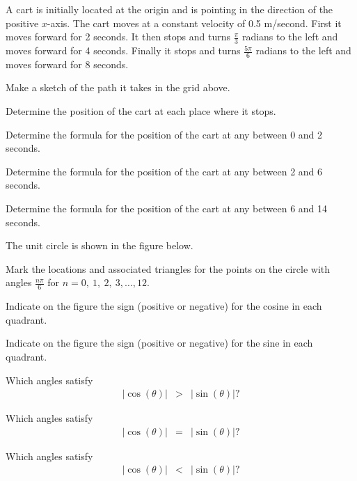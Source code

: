 \begin{problem}
\item A cart is initially located at the origin and is pointing in the
  direction of the positive $x$-axis. The cart moves at a constant
  velocity of 0.5 m/second. First it moves forward for 2 seconds. It
  then stops and turns $\frac{\pi}{3}$ radians to the left and moves
  forward for 4 seconds. Finally it stops and turns $\frac{5\pi}{6}$
  radians to the left and moves forward for 8 seconds.

  \scalebox{0.65}{}

  \begin{subproblem}
    \item Make a sketch of the path it takes in the grid above.
    \item Determine the position of the cart at each place where it
      stops. 
      \vfill
      \clearpage
    \item Determine the formula for the position of the cart at any
      between 0 and 2 seconds.
      \vfill
    \item Determine the formula for the position of the cart at any
      between 2 and 6 seconds.
      \vfill
    \item Determine the formula for the position of the cart at any
      between 6 and 14 seconds.
      \vfill
  \end{subproblem}

  \clearpage

\item The unit circle is shown in the figure below. 

  \scalebox{0.85}{}

  \begin{subproblem}
  \item Mark the locations and associated triangles for the points on
    the circle with angles $\frac{n\pi}{6}$ for $n=0,~1,~2,~3,\ldots,12$.
  \item Indicate on the figure the sign (positive or negative) for the
    cosine in each quadrant.
  \item Indicate on the figure the sign (positive or negative) for the
    sine in each quadrant.

    \clearpage

  \item Which angles satisfy
    \begin{eqnarray*}
      |\cos(\theta)| & > & |\sin(\theta) |?
    \end{eqnarray*}
    \vfill
  \item Which angles satisfy
    \begin{eqnarray*}
      |\cos(\theta)| & = & |\sin(\theta) |?
    \end{eqnarray*}
    \vfill
  \item Which angles satisfy
    \begin{eqnarray*}
      |\cos(\theta)| & < & |\sin(\theta) |?
    \end{eqnarray*}
    \vfill
  \end{subproblem}


\end{problem}

